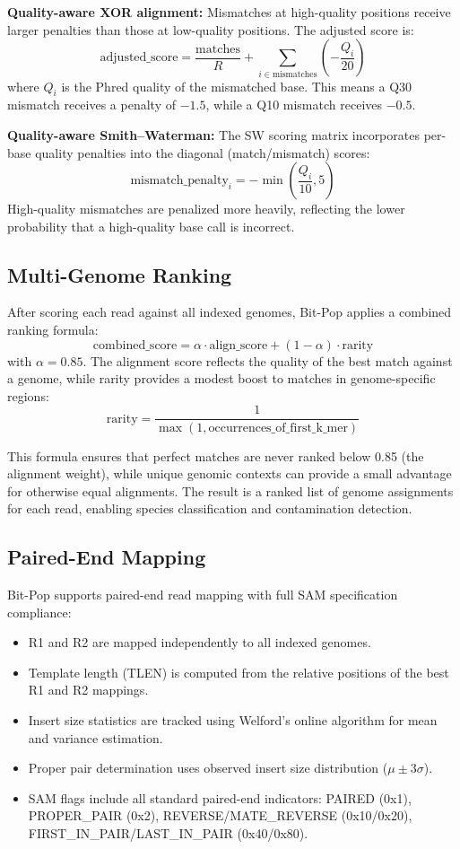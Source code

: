 \documentclass[10pt]{article}
\begin{document}
\textbf{Quality-aware XOR alignment:} Mismatches at high-quality positions receive larger penalties than those at low-quality positions. The adjusted score is:
\[
\text{adjusted\_score} = \frac{\text{matches}}{R} + \sum_{i \in \text{mismatches}} \left(-\frac{Q_i}{20}\right)
\]
where $Q_i$ is the Phred quality of the mismatched base. This means a Q30 mismatch receives a penalty of $-1.5$, while a Q10 mismatch receives $-0.5$.

\textbf{Quality-aware Smith--Waterman:} The SW scoring matrix incorporates per-base quality penalties into the diagonal (match/mismatch) scores:
\[
\text{mismatch\_penalty}_i = -\min\left(\frac{Q_i}{10}, 5\right)
\]
High-quality mismatches are penalized more heavily, reflecting the lower probability that a high-quality base call is incorrect.

\subsection{Multi-Genome Ranking}

After scoring each read against all indexed genomes, Bit-Pop applies a combined ranking formula:
\[
\text{combined\_score} = \alpha \cdot \text{align\_score} + (1 - \alpha) \cdot \text{rarity}
\]
with $\alpha = 0.85$. The alignment score reflects the quality of the best match against a genome, while rarity provides a modest boost to matches in genome-specific regions:
\[
\text{rarity} = \frac{1}{\max(1, \text{occurrences\_of\_first\_k\_mer})}
\]

This formula ensures that perfect matches are never ranked below 0.85 (the alignment weight), while unique genomic contexts can provide a small advantage for otherwise equal alignments. The result is a ranked list of genome assignments for each read, enabling species classification and contamination detection.

\subsection{Paired-End Mapping}

Bit-Pop supports paired-end read mapping with full SAM specification compliance:
\begin{itemize}
    \item R1 and R2 are mapped independently to all indexed genomes.
    \item Template length (TLEN) is computed from the relative positions of the best R1 and R2 mappings.
    \item Insert size statistics are tracked using Welford's online algorithm \citep{welford1962} for mean and variance estimation.
    \item Proper pair determination uses observed insert size distribution ($\mu \pm 3\sigma$).
    \item SAM flags include all standard paired-end indicators: PAIRED (0x1), PROPER\_PAIR (0x2), REVERSE/MATE\_REVERSE (0x10/0x20), FIRST\_IN\_PAIR/LAST\_IN\_PAIR (0x40/0x80).
\end{itemize}
\end{document}
